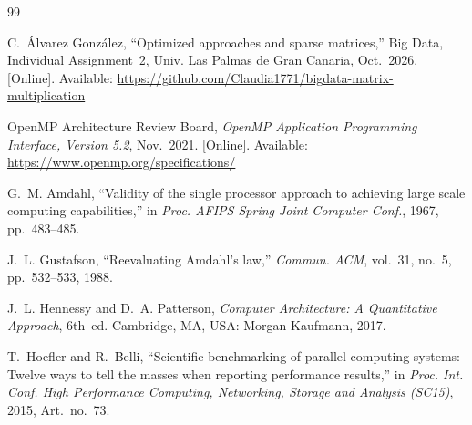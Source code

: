 \documentclass[12pt,a4paper]{report}
\begin{document}
\begin{thebibliography}{99}

 C.~Álvarez González, ``Optimized approaches and sparse matrices,'' Big Data, Individual Assignment~2,
Univ. Las Palmas de Gran Canaria, Oct.~2026. [Online]. Available:
\url{https://github.com/Claudia1771/bigdata-matrix-multiplication}

 OpenMP Architecture Review Board, \textit{OpenMP Application Programming Interface, Version 5.2},
Nov.~2021. [Online]. Available: \url{https://www.openmp.org/specifications/}

 G.~M. Amdahl, ``Validity of the single processor approach to achieving large scale computing
capabilities,'' in \textit{Proc. AFIPS Spring Joint Computer Conf.}, 1967, pp.~483--485.

 J.~L. Gustafson, ``Reevaluating Amdahl's law,'' \textit{Commun. ACM}, vol.~31, no.~5,
pp.~532--533, 1988.

 J.~L. Hennessy and D.~A. Patterson, \textit{Computer Architecture: A Quantitative Approach},
6th~ed. Cambridge, MA, USA: Morgan Kaufmann, 2017.

 T.~Hoefler and R.~Belli, ``Scientific benchmarking of parallel computing systems: Twelve ways to
tell the masses when reporting performance results,'' in \textit{Proc. Int. Conf. High Performance Computing,
Networking, Storage and Analysis (SC15)}, 2015, Art.~no.~73.

\end{thebibliography}
\end{document}
